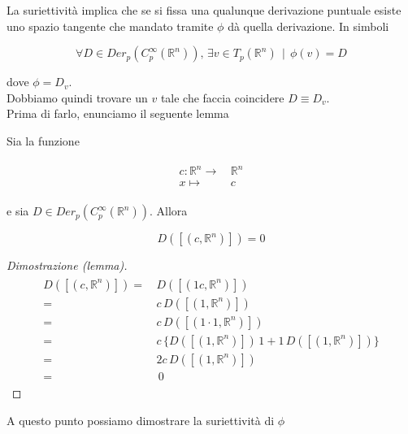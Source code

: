 La suriettività implica che se si fissa una qualunque derivazione puntuale esiste uno spazio tangente che mandato tramite $ \phi $ dà quella derivazione. In simboli

\begin{equation}
	\forall D \in Der_{p} (C_{p}^{\infty}(\mathbb{R}^{n})), \, \exists v \in T_{p}(\mathbb{R}^{n}) \, \mid \, \phi(v) = D
\end{equation}

dove $ \phi = D_{v} $.\\
Dobbiamo quindi trovare un $ v $ tale che faccia coincidere $ D \equiv D_{v} $.\\
Prima di farlo, enunciamo il seguente lemma

\begin{lemma}
	Sia la funzione
	
	\begin{align}
		\begin{split}
			c : \mathbb{R}^{n} \to& \, \mathbb{R}^{n}\\
			x \mapsto& \, c
		\end{split}
	\end{align}

	e sia $ D \in Der_{p} (C_{p}^{\infty}(\mathbb{R}^{n})) $. Allora
	
	\begin{equation}
		D([(c,\mathbb{R}^{n})]) = 0
	\end{equation}
\end{lemma}

\begin{proof}[Dimostrazione (lemma)]
	\begin{align}
		\begin{split}
			D([(c,\mathbb{R}^{n})]) =& \, D([(1 c,\mathbb{R}^{n})])\\
			=& \, c \, D([(1,\mathbb{R}^{n})])\\
			=& \, c \, D([(1 \cdot 1,\mathbb{R}^{n})])\\
			=& \, c \, \{D([(1,\mathbb{R}^{n})]) \, 1 + 1 \, D([(1,\mathbb{R}^{n})])\}\\
			=& \, 2 c \, D([(1,\mathbb{R}^{n})])\\
			=& \, \, 0
		\end{split}
	\end{align}
\end{proof}

A questo punto possiamo dimostrare la suriettività di $ \phi $

